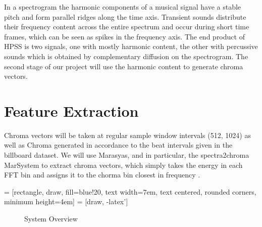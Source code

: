 \documentclass{article}
\begin{document}
In a spectrogram the harmonic components of a musical signal have a stable
pitch and form parallel ridges along the time axis. Transient sounds distribute
their frequency content across the entire spectrum and occur during short time
frames, which can be seen as spikes in the frequency axis. The end product of
HPSS is two signals, one with mostly harmonic content, the other with
percussive sounds which is obtained by complementary diffusion on the
spectrogram. The second stage of our project will use the harmonic content to
generate chroma vectors.

\section{Feature Extraction}

Chroma vectors will be taken at regular sample window intervals (512, 1024) as well as Chroma generated in accordance to the beat intervals given in the billboard dataset.  We will use Marasyas, and in particular, the spectra2chroma MarSystem to extract chroma vectors, which simply takes the energy in each FFT bin and assigns it to the chorma bin closest in frequency . 

 = [rectangle, draw, fill=blue!20,
    text width=7em, text centered, rounded corners, minimum height=4em]
 = [draw, -latex']

\begin{figure}
\caption{System Overview}
\end{figure}
\end{document}
